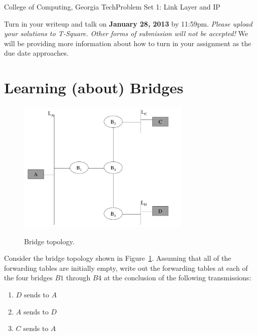 \documentclass[11pt]{article}
\begin{document}


{College of Computing, Georgia Tech}{Problem Set 1: Link Layer and
  IP} 


Turn in your writeup and talk on {\bf January 28, 2013} by 11:59pm.
{\em Please upload your solutions to T-Square.  Other forms of
  submission will not be accepted!}  We will be providing more
information about how to turn in your assignment as the due date
approaches.

\section{Learning (about) Bridges}

\begin{figure}[h]
\centering\includegraphics[height=2.5in]{ps1-bridge}
\label{f:ps1-bridge}
\caption{Bridge topology.}
\end{figure}

Consider the bridge topology shown in Figure~\ref{f:ps1-bridge}.
Assuming that all of the forwarding tables are initially empty, write
out the forwarding tables at each of the four bridges $B1$ through $B4$
at the conclusion of the following transmissions:

\begin{enumerate}
\item $D$ sends to $A$
\item $A$ sends to $D$
\item $C$ sends to $A$
\end{enumerate}
\end{document}
